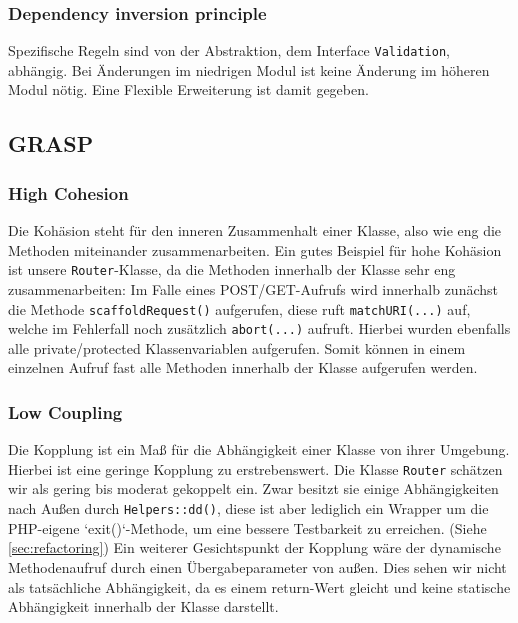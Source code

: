 \documentclass[12pt,a4paper,titlepage,ngerman,pdftex]{report}
\begin{document}
    \subsubsection{Dependency inversion principle}
    Spezifische Regeln sind von der Abstraktion, dem Interface \verb|Validation|, abhängig. Bei Änderungen im niedrigen Modul ist keine Änderung im höheren Modul nötig. Eine Flexible Erweiterung ist damit gegeben.
    \subsection{GRASP}
    \label{subsec:grasp}

    \subsubsection{High Cohesion}
    Die Kohäsion steht für den inneren Zusammenhalt einer Klasse, also wie \glqq eng\grqq{} die Methoden miteinander zusammenarbeiten.
    Ein gutes Beispiel für hohe Kohäsion ist unsere \verb|Router|-Klasse, da die Methoden innerhalb der Klasse sehr eng zusammenarbeiten:
    Im Falle eines POST/GET-Aufrufs wird innerhalb zunächst die Methode \verb|scaffoldRequest()| aufgerufen, diese ruft \verb|matchURI(...)| auf, welche im Fehlerfall noch zusätzlich \verb|abort(...)| aufruft.
    Hierbei wurden ebenfalls alle private/protected Klassenvariablen aufgerufen.
    Somit können in einem einzelnen Aufruf fast alle Methoden innerhalb der Klasse aufgerufen werden.

    \subsubsection{Low Coupling}
    Die Kopplung ist ein Maß für die Abhängigkeit einer Klasse von ihrer Umgebung.
    Hierbei ist eine geringe Kopplung zu erstrebenswert.
    Die Klasse \verb|Router| schätzen wir als gering bis moderat gekoppelt ein.
    Zwar besitzt sie einige Abhängigkeiten nach Außen durch \verb|Helpers::dd()|, diese ist aber lediglich ein Wrapper um die PHP-eigene `exit()`-Methode, um eine bessere Testbarkeit zu erreichen. (Siehe \ref{sec:refactoring})
    Ein weiterer Gesichtspunkt der Kopplung wäre der dynamische Methodenaufruf durch einen Übergabeparameter von außen.
    Dies sehen wir nicht als tatsächliche Abhängigkeit, da es einem return-Wert gleicht und keine statische Abhängigkeit innerhalb der Klasse darstellt.
    
\end{document}
